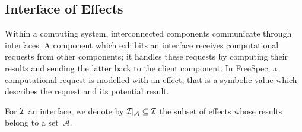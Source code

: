 \subsection{Interface of Effects}

Within a computing system, interconnected components communicate through
interfaces.
%
A component which exhibits an interface receives computational requests from
other components; it handles these requests by computing their results and
sending the latter back to the client component.
%
In FreeSpec, a computational request is modelled with an effect, that is a
symbolic value which describes the request and its potential result.

For $\mathcal{I}$ an interface, we denote by $\mathcal{I}|_{\mathcal{A}} \subseteq \mathcal{I}$
the subset of effects whose results belong to a set~$\mathcal{A}$.

